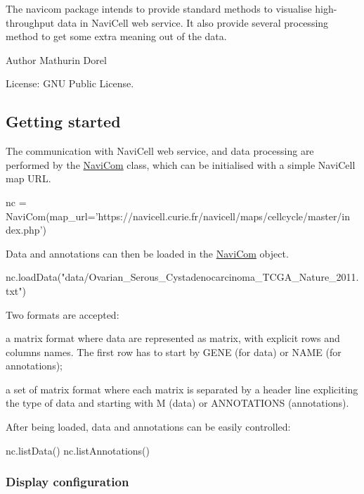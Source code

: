 The navicom package intends to provide standard methods to visualise high-\/throughput data in NaviCell web service. It also provide several processing method to get some extra meaning out of the data.

\begin{DoxyAuthor}{Author}
Mathurin Dorel 
\end{DoxyAuthor}
\begin{DoxyParagraph}{License: GNU Public License.}

\end{DoxyParagraph}
\hypertarget{main_start}{}\subsection{Getting started}\label{main_start}
The communication with NaviCell web service, and data processing are performed by the \hyperlink{classnavicom_1_1navicom_1_1NaviCom}{NaviCom} class, which can be initialised with a simple NaviCell map URL. 
\begin{DoxyCode}
nc = NaviCom(map\_url=\textcolor{stringliteral}{'https://navicell.curie.fr/navicell/maps/cellcycle/master/in
      dex.php'})
\end{DoxyCode}
 Data and annotations can then be loaded in the \hyperlink{classnavicom_1_1navicom_1_1NaviCom}{NaviCom} object. 
\begin{DoxyCode}
nc.loadData(\textcolor{stringliteral}{"data/Ovarian\_Serous\_Cystadenocarcinoma\_TCGA\_Nature\_2011.txt"})
\end{DoxyCode}
 Two formats are accepted: \begin{DoxyItemize}
\item a matrix format where data are represented as matrix, with explicit rows and columns names. The first row has to start by GENE (for data) or NAME (for annotations); \item a set of matrix format where each matrix is separated by a header line expliciting the type of data and starting with M (data) or ANNOTATIONS (annotations).\end{DoxyItemize}
After being loaded, data and annotations can be easily controlled: 
\begin{DoxyCode}
nc.listData()
nc.listAnnotations()
\end{DoxyCode}
\hypertarget{main_display_config}{}\subsubsection{Display configuration}\label{main_display_config}

